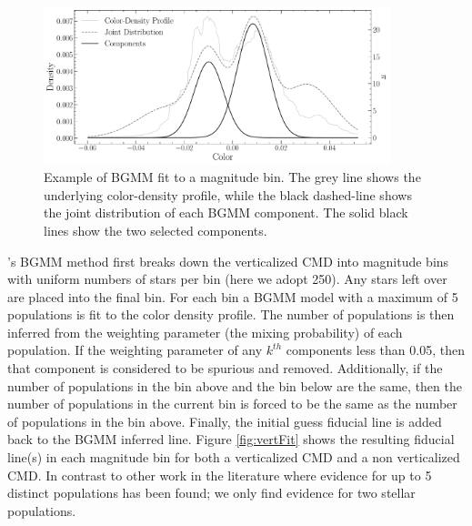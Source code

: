 \begin{figure}
	\centering
	\includegraphics[width=0.9\textwidth]{BGMMMixingBin.pdf}
	\caption{Example of BGMM fit to a magnitude bin. The grey line shows the
	underlying color-density profile, while the black dashed-line shows the
	joint distribution of each BGMM component. The solid black lines show the
	two selected components.}
	\label{fig:BGMMDist}
\end{figure}

\fidanka's BGMM method first breaks down the verticalized CMD into magnitude
bins with uniform numbers of stars per bin (here we adopt 250). Any stars left
over are placed into the final bin. For each bin a BGMM model with a maximum of
5 populations is fit to the color density profile. The number of populations is
then inferred from the weighting parameter (the mixing probability) of each
population. If the weighting parameter of any $k^{th}$ components less than
{\color{blue}0.05}, then that component is considered to be spurious and
removed. Additionally, if the number of populations in the bin above and the
bin below are the same, then the number of populations in the current bin is
forced to be the same as the number of populations in the bin above. Finally,
the initial guess fiducial line is added back to the BGMM inferred line. Figure
\ref{fig:vertFit} shows the resulting fiducial line(s) in each magnitude bin
for both a verticalized CMD and a non verticalized CMD. In contrast to other
work in the literature where evidence for up to 5 distinct populations has been
found; we only find evidence for two stellar populations.

